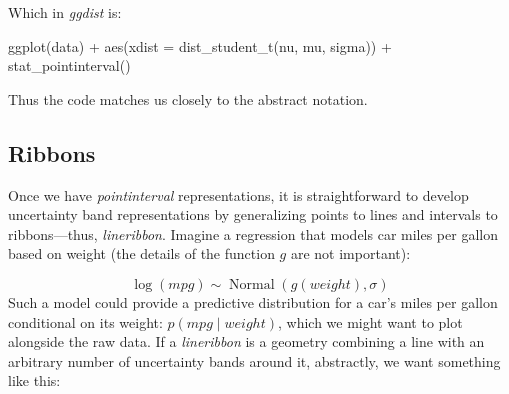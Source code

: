 \documentclass[journal]{vgtc}                     %
\newenvironment{centerverbatim}{%
  \hfill\break
  \small
  \centering
  \varwidth{\linewidth}%
  \verbatim
}{%
  \endverbatim
  \endvarwidth
  \par
  \hfill\break
}
\begin{document}
Which in \textit{ggdist} is:

\begin{centerverbatim}
ggplot(data) +
  aes(xdist = dist_student_t(nu, mu, sigma)) +
  stat_pointinterval()
\end{centerverbatim}

Thus the code matches us closely to the abstract notation.

\subsection{Ribbons}

Once we have \textit{pointinterval} representations, it is straightforward to develop uncertainty band representations by generalizing points to lines and intervals to ribbons---thus, \textit{lineribbon}. Imagine a regression that models car miles per gallon based on weight (the details of the function $g$ are not important):

\[
\log(\mathit{mpg}) \sim \operatorname{Normal}\left(g(\mathit{weight}), \sigma\right)
\]
Such a model could provide a predictive distribution for a car's miles per gallon conditional on its weight: $p(\mathit{mpg} \mid \mathit{weight})$, which we might want to plot alongside the raw data. If a \textit{lineribbon} is a geometry combining a line with an arbitrary number of uncertainty bands around it, abstractly, we want something like this:
\end{document}
